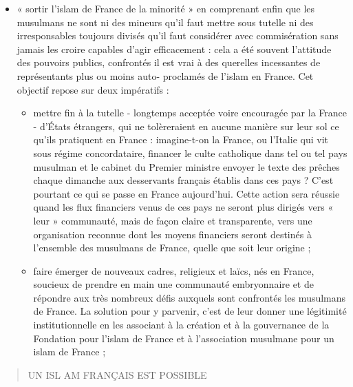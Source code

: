 \begin{itemize}
\item
  « sortir l'islam de France de la minorité » en comprenant enfin que
  les musulmans ne sont ni des mineurs qu'il faut mettre sous tutelle ni
  des irresponsables toujours divisés qu'il faut considérer avec
  commisération sans jamais les croire capables d'agir efficacement :
  cela a été souvent l'attitude des pouvoirs publics, confrontés il est
  vrai à des querelles incessantes de représentants plus ou moins auto-
  proclamés de l'islam en France. Cet objectif repose sur deux
  impératifs :

  \begin{itemize}
  \item
    mettre fin à la tutelle - longtemps acceptée voire encouragée par la
    France - d'États étrangers, qui ne tolèreraient en aucune manière
    sur leur sol ce qu'ils pratiquent en France : imagine-t-on la
    France, ou l'Italie qui vit sous régime concordataire, financer le
    culte catholique dans tel ou tel pays musulman et le cabinet du
    Premier ministre envoyer le texte des prêches chaque dimanche aux
    desservants français établis dans ces pays ? C'est pourtant ce qui
    se passe en France aujourd'hui. Cette action sera réussie quand les
    flux financiers venus de ces pays ne seront plus dirigés vers « leur
    » communauté, mais de façon claire et transparente, vers une
    organisation reconnue dont les moyens financiers seront destinés à
    l'ensemble des musulmans de France, quelle que soit leur origine ;
  \item
    faire émerger de nouveaux cadres, religieux et laïcs, nés en France,
    soucieux de prendre en main une communauté embryonnaire et de
    répondre aux très nombreux défis auxquels sont confrontés les
    musulmans de France. La solution pour y parvenir, c'est de leur
    donner une légitimité institutionnelle en les associant à la
    création et à la gouvernance de la Fondation pour l'islam de France
    et à l'association musulmane pour un islam de France ;
  \end{itemize}
\end{itemize}

\begin{quote}
UN ISL AM FRANÇAIS EST POSSIBLE
\end{quote}

